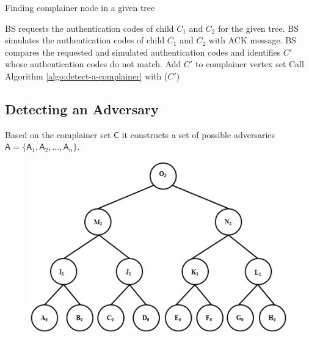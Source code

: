 \documentclass[%
  slidesonly,%
  semlayer%
  ]{seminar}                                  %
\begin{document}
\begin{slide}
        \begin{algorithm}
          \caption{Finding complainer node in a given tree}
          \label{algo:detect-a-complainer}
          \begin{algorithmic}[1]
            \STATE BS requests the authentication codes of child $C_{1}$ and $C_{2}$ for the given tree.
            \STATE BS simulates the authentication codes of child $C_{1}$ and $C_{2}$ with ACK message.
            \STATE BS compares the requested and simulated authentication codes and identifies $C'$ whose authentication codes do not match.
              \STATE Add $C'$ to complainer vertex set  
            \ELSE
              \STATE Call Algorithm \ref{algo:detect-a-complainer} with ($C'$)      
            \ENDIF
          \end{algorithmic}
        \end{algorithm}


        \vfill
        \clearpage

      \subsection*{Detecting an Adversary}
        \vfill
    
        Based on the complainer set $\textsf{C}$ it constructs a set of possible adversaries $\textsf{A} = \{\textsf{A}_{1},\textsf{A}_{2},\dotsc,\textsf{A}_{n}\}$. 

        \begin{figure}[t]
          \centering
          \includegraphics[scale=0.4]{images/possible-cheaters.png}
        \end{figure}


\end{slide}
\end{document}
